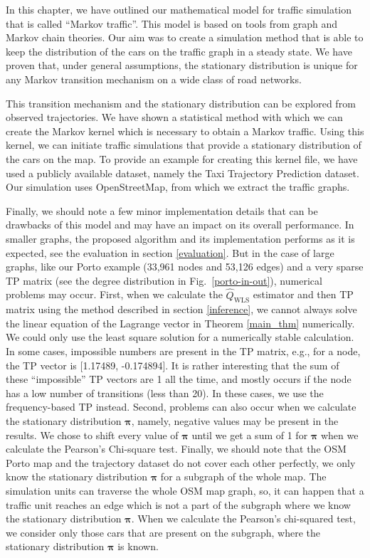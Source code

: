 \documentclass[b5paper,12pt]{report}
\theoremstyle{definition}
\newcommand{\bpi}{\boldsymbol{\pi}}
\begin{document}
In this chapter, we have outlined our mathematical model for traffic simulation that is called \enquote{Markov traffic}. This model is based on tools from graph and Markov chain theories. Our aim was to create a simulation method that is able to keep the distribution of the cars on the traffic graph in a steady state. We have proven that, under general assumptions, the stationary distribution is unique for any Markov transition mechanism on a wide class of road networks.

This transition mechanism and the stationary distribution can be explored from observed trajectories. We have shown a statistical method with which we can create the Markov kernel which is necessary to obtain a Markov traffic. Using this kernel, we can initiate traffic simulations that provide a stationary distribution of the cars on the map. To provide an example for creating this kernel file, we have used a publicly available dataset, namely the Taxi Trajectory Prediction dataset. Our simulation uses OpenStreetMap, from which we extract the traffic graphs.

Finally, we should note a few minor implementation details that can be drawbacks of this model and may have an impact on its overall performance. In smaller graphs, the proposed algorithm and its implementation performs as it is expected, see the evaluation in section \ref{evaluation}. But in the case of large graphs, like our Porto example (33,961 nodes and 53,126 edges) and a very sparse TP matrix (see the degree distribution in Fig.~\ref{porto-in-out}), numerical problems may occur. First, when we calculate the $\widehat{Q}_{\textrm{WLS}}$ estimator and then TP matrix using the method described in section \ref{inference}, we cannot always solve the linear equation of the Lagrange vector in Theorem \ref{main_thm} numerically. We could only use the least square solution for a numerically stable calculation. In some cases, impossible numbers are present in the TP matrix, e.g., for a node, the TP vector is [1.17489, -0.174894]. It is rather interesting that the sum of these \enquote{impossible} TP vectors are 1 all the time, and mostly occurs if the node has a low number of transitions (less than 20). In these cases, we use the frequency-based TP instead. Second, problems can also occur when we calculate the stationary distribution $\bpi$, namely, negative values may be present in the results. We chose to shift every value of $\bpi$ until we get a sum of 1 for $\bpi$ when we calculate the Pearson's Chi-square test. Finally, we should note that the OSM Porto map and the trajectory dataset do not cover each other perfectly, we only know the stationary distribution $\bpi$ for a subgraph of the whole map. The simulation units can traverse the whole OSM map graph, so, it can happen that a traffic unit reaches an edge which is not a part of the subgraph where we know the stationary distribution $\bpi$. When we calculate the Pearson's chi-squared test, we consider only those cars that are present on the subgraph, where the stationary distribution $\bpi$ is known.
\end{document}
